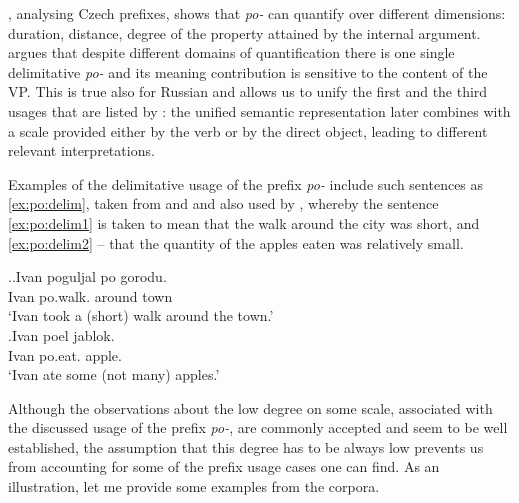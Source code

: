 \citet{Souchkova:04}, analysing Czech prefixes, shows that \textit{po-} can quantify over different dimensions: duration, distance, degree of the property attained by the internal argument. \citeauthor{Souchkova:04} argues that despite different domains of quantification there is one single delimitative \textit{po-} and its meaning contribution is sensitive to the content of the VP. This is true also for Russian and allows us to unify the first and the third usages that are listed by \citet{Shvedova:82}: the unified semantic representation later combines with a scale provided either by the verb or by the direct object, leading to different relevant interpretations.

Examples of the delimitative usage of the prefix \textit{po-} include such sentences as \ref{ex:po:delim}, taken from \citet{Filip:00} and \citet{Souchkova:04} and also used by \citet{Kagan:book}, whereby the sentence \ref{ex:po:delim1} is taken to mean that the walk around the city was short, and \ref{ex:po:delim2} -- that the quantity of the apples eaten was relatively small.

\ex.\label{ex:po:delim}\ag.\label{ex:po:delim1}Ivan poguljal po gorodu.\\
Ivan po.walk. around town\\
\trans `Ivan took a (short) walk around the town.'\\
\bg.\label{ex:po:delim2}Ivan poel jablok.\\
Ivan po.eat. apple.\\
\trans `Ivan ate some (not many) apples.'


Although the observations about the low degree on some scale, associated with the discussed usage of the prefix \textit{po-}, are commonly accepted and seem to be well established, the assumption that this degree has to be always low prevents us from accounting for some of the prefix usage cases one can find. As an illustration, let me provide some examples from the corpora.

